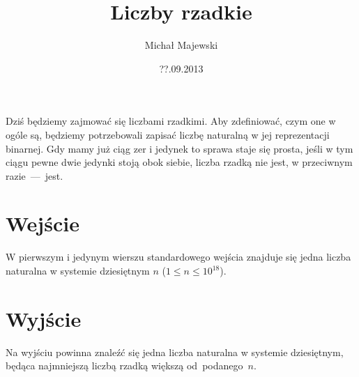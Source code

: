 \documentclass[zad,zawodnik]{sinol}
\title{Liczby rzadkie}
\author{Micha\l{} Majewski} %
\date{??.09.2013}
\begin{document}
  \begin{tasktext}%
Dzi\'s b\k{e}dziemy zajmowa\'c si\k{e} liczbami rzadkimi. Aby zdefiniowa\'c, czym one w og\'ole s\k{a}, b\k{e}dziemy potrzebowali zapisa\'c liczb\k{e} naturaln\k{a} w jej reprezentacji binarnej. Gdy mamy ju\.z ci\k{a}g zer i jedynek to sprawa staje si\k{e} prosta, je\'sli w tym ci\k{a}gu pewne dwie jedynki stoj\k{a} obok siebie, liczba rzadk\k{a} nie jest, w przeciwnym razie~---~jest.

  \section{Wej\'scie}
W pierwszym i jedynym wierszu standardowego wej\'scia znajduje si\k{e} jedna liczba naturalna w systemie dziesi\k{e}tnym $n$ ($1 \leq n \leq 10^{18}$).

  \section{Wyj\'scie}

Na wyj\'sciu powinna znale\'z\'c si\k{e} jedna liczba naturalna w systemie dziesi\k{e}tnym, b\k{e}d\k{a}ca najmniejsz\k{a} liczb\k{a} rzadk\k{a} wi\k{e}ksz\k{a} od~podanego~$n$.
     \makecompactexample    
   
\medskip
\noindent

  \end{tasktext}
\end{document}
